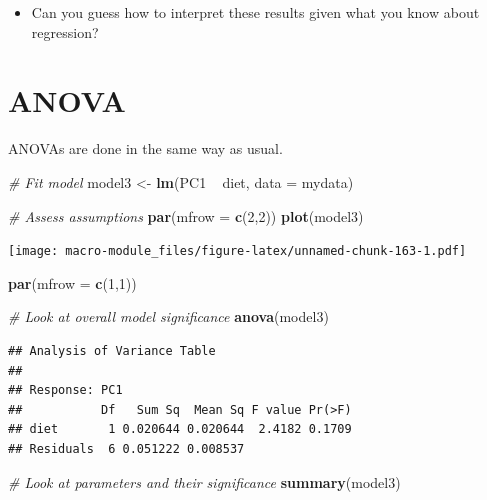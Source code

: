 \documentclass[]{book}
\newenvironment{Shaded}{\begin{snugshade}}{\end{snugshade}}
\newcommand{\KeywordTok}[1]{\textcolor[rgb]{0.13,0.29,0.53}{\textbf{{#1}}}}
\newcommand{\DataTypeTok}[1]{\textcolor[rgb]{0.13,0.29,0.53}{{#1}}}
\newcommand{\DecValTok}[1]{\textcolor[rgb]{0.00,0.00,0.81}{{#1}}}
\newcommand{\StringTok}[1]{\textcolor[rgb]{0.31,0.60,0.02}{{#1}}}
\newcommand{\CommentTok}[1]{\textcolor[rgb]{0.56,0.35,0.01}{\textit{{#1}}}}
\newcommand{\NormalTok}[1]{{#1}}
\providecommand{\tightlist}{%
  \setlength{\itemsep}{0pt}\setlength{\parskip}{0pt}}
\begin{document}
\begin{itemize}
\tightlist
\item
  Can you guess how to interpret these results given what you know about
  regression?
\end{itemize}

\section{ANOVA}\label{anova}

ANOVAs are done in the same way as usual.

\begin{Shaded}
\begin{Highlighting}[]
\CommentTok{# Fit model}
\NormalTok{model3 <-}\StringTok{ }\KeywordTok{lm}\NormalTok{(PC1 ~}\StringTok{ }\NormalTok{diet, }\DataTypeTok{data =} \NormalTok{mydata)}

\CommentTok{# Assess assumptions}
\KeywordTok{par}\NormalTok{(}\DataTypeTok{mfrow =} \KeywordTok{c}\NormalTok{(}\DecValTok{2}\NormalTok{,}\DecValTok{2}\NormalTok{))}
\KeywordTok{plot}\NormalTok{(model3)}
\end{Highlighting}
\end{Shaded}

\texttt{[image: macro-module\_files/figure-latex/unnamed-chunk-163-1.pdf]}

\begin{Shaded}
\begin{Highlighting}[]
\KeywordTok{par}\NormalTok{(}\DataTypeTok{mfrow =} \KeywordTok{c}\NormalTok{(}\DecValTok{1}\NormalTok{,}\DecValTok{1}\NormalTok{))}

\CommentTok{# Look at overall model significance}
\KeywordTok{anova}\NormalTok{(model3)}
\end{Highlighting}
\end{Shaded}

\begin{verbatim}
## Analysis of Variance Table
## 
## Response: PC1
##           Df   Sum Sq  Mean Sq F value Pr(>F)
## diet       1 0.020644 0.020644  2.4182 0.1709
## Residuals  6 0.051222 0.008537
\end{verbatim}

\begin{Shaded}
\begin{Highlighting}[]
\CommentTok{# Look at parameters and their significance}
\KeywordTok{summary}\NormalTok{(model3)}
\end{Highlighting}
\end{Shaded}
\end{document}
